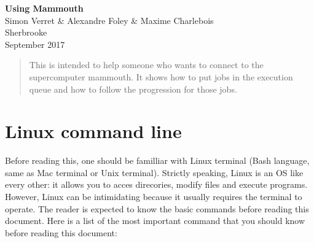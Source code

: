 \documentclass[10pt,letter]{article}
\begin{document}

\begin{centering}

\Large{\textbf{Using Mammouth}}\\
\normalsize{Simon Verret \& Alexandre Foley \& Maxime Charlebois}\\
\small{Sherbrooke\\ September 2017}

\end{centering}



\begin{abstract}
This is intended to help someone who wants to connect to the supercomputer mammouth. It shows how to put jobs in the execution queue and how to follow the progression for those jobs.
\end{abstract}

\tableofcontents

\renewcommand{\baselinestretch}{1.00}
\setlength{\parskip}{0.8\baselineskip}
\setlength{\parindent}{0mm}


\vspace{2mm}

\section{Linux command line}
Before reading this, one should be familliar with Linux terminal 
(Bash language, same as Mac terminal or Unix terminal). 
Strictly speaking, Linux is an OS like every other: 
it allows you to acces direcories, modify files and execute programs. 
However, Linux can be intimidating because it usually requires the terminal to operate.
The reader is expected to know the basic commands before reading this document. 
Here is a list of the most important command that you should know before reading this document:
\end{document}
